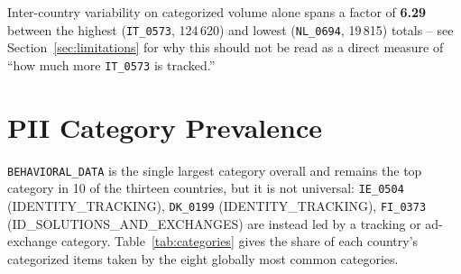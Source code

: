 \documentclass[11pt,a4paper]{article}
\newcommand{\code}[1]{\texttt{#1}}
\begin{document}
Inter-country variability on categorized volume alone spans a factor of
\textbf{6.29} between the highest (\code{IT\_0573}, 124\,620) and
lowest (\code{NL\_0694}, 19\,815) totals -- see
Section~\ref{sec:limitations} for why this should not be read as a direct
measure of ``how much more \code{IT\_0573} is tracked.''

\section{PII Category Prevalence}

\code{BEHAVIORAL\_DATA} is the single largest category overall and remains the
top category in 10 of the thirteen countries, but it is not
universal: \code{IE\_0504} (IDENTITY\_TRACKING), \code{DK\_0199} (IDENTITY\_TRACKING), \code{FI\_0373} (ID\_SOLUTIONS\_AND\_EXCHANGES) are instead led by a tracking or ad-exchange
category. Table~\ref{tab:categories} gives the share of each country's
categorized items taken by the eight globally most common categories.
\end{document}
